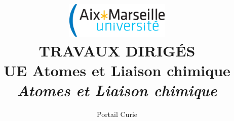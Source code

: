 \documentclass[12pt,a4paper,french,dvips,openright,twoside]{report}
\begin{document}
\title{{\includegraphics[width=5cm]{figure/logo-amu_cmjn.eps}      \\ [1cm]
\Huge \textbf{TRAVAUX DIRIG\'ES  \\[1.5cm] 
UE Atomes et Liaison chimique\\
\textsl{Atomes et Liaison chimique}}}}
\author{Portail Curie}
\date{}%

\pagestyle{empty}
\maketitle

\tableofcontents

\pagestyle{plain}



%
%
%






\pagestyle{empty}



%
%
\end{document}
